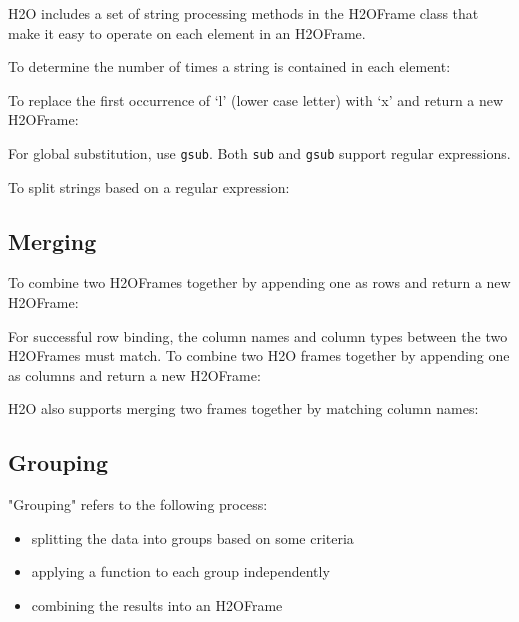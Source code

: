 {H2O includes a set of string processing methods in the H2OFrame class
that make it easy to operate on each element in an H2OFrame.  

To determine the number of times a string is contained in each element:


To replace the first occurrence of `l' (lower case letter) with `x' and return a new H2OFrame:


For global substitution, use {\texttt{gsub}}.  Both {\texttt{sub}} and {\texttt{gsub}} support regular expressions. 

To split strings based on a regular expression:



\subsection{Merging}
To combine two H2OFrames together by appending one as rows and return a new H2OFrame:


For successful row binding, the column names and column types between the two H2OFrames must match. To combine two H2O frames together by appending one as columns and return a new H2OFrame:



\newpage
H2O also supports merging two frames together by matching column names:


\subsection{Grouping}

"Grouping" refers to the following process:

\begin{itemize}
\item splitting the data into groups based on some criteria 
\item applying a function to each group independently
\item combining the results into an H2OFrame
\end{itemize}

}
